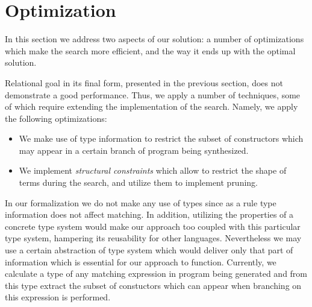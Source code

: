 \section{Optimization}
\label{sec:optimization}

In this section we address two aspects of our solution: a number of optimizations which make the search more efficient, and
the way it ends up with the optimal solution.

Relational goal in its final form, presented in the previous section, does not demonstrate a good performance. Thus, we apply a number
of techniques, some of which require extending the implementation of the search. Namely, we apply the following optimizations:

\begin{itemize}
\item We make use of type information to restrict the subset of constructors which may appear in a certain branch of
  program being synthesized.
\item We implement \emph{structural constraints} which allow to restrict the shape of terms during the search, and
  utilize them to implement pruning.  
\end{itemize}

In our formalization we do not make any use of types since as a rule type information does not affect matching. In addition,
utilizing the properties of a concrete type system would make our approach too coupled with this particular type system, hampering
its reusability for other languages. Nevertheless we may use a certain abstraction of type system which would deliver only
that part of information which is essential for our approach to function. Currently, we calculate a type of any matching expression in
program being generated and from this type extract the subset of constuctors which can appear when branching on this expression
is performed. 
